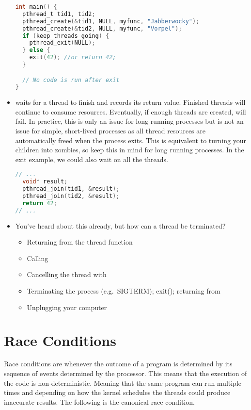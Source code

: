 \begin{itemize}
\begin{lstlisting}[language=C]
int main() {
  pthread_t tid1, tid2;
  pthread_create(&tid1, NULL, myfunc, "Jabberwocky");
  pthread_create(&tid2, NULL, myfunc, "Vorpel");
  if (keep_threads_going) {
    pthread_exit(NULL); 
  } else {
    exit(42); //or return 42;
  }

  // No code is run after exit
}
\end{lstlisting}

\item {} waits for a thread to finish and records its return value.
Finished threads will continue to consume resources.
Eventually, if enough threads are created,  will fail.
In practice, this is only an issue for long-running processes but is not an issue for simple, short-lived processes as all thread resources are automatically freed when the process exits.
This is equivalent to turning your children into zombies, so keep this in mind for long running processes. In the exit example, we could also wait on all the threads.

\begin{lstlisting}[language=C]
// ...
  void* result;
  pthread_join(tid1, &result);
  pthread_join(tid2, &result); 
  return 42;
// ...
\end{lstlisting}

\item You've heard about this already, but how can a thread be terminated? 
\begin{itemize}
\item Returning from the thread function 
\item Calling  
\item Cancelling the thread with  
\item Terminating the process (e.g.~SIGTERM); exit(); returning from 
\item Unplugging your computer
\end{itemize}

\end{itemize}

\section{Race Conditions}

Race conditions are whenever the outcome of a program is determined by its sequence of events determined by the processor.
This means that the execution of the code is non-deterministic.
Meaning that the same program can run multiple times and depending on how the kernel schedules the threads could produce inaccurate results.
The following is the canonical race condition.

